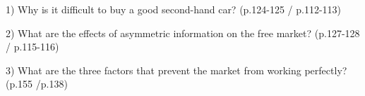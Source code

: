1) Why is it difficult to buy a good second-hand car? (p.124-125 / p.112-113)

2) What are the effects of asymmetric information on the free market? (p.127-128 / p.115-116)

3) What are the three factors that prevent the market from working perfectly? (p.155 /p.138)